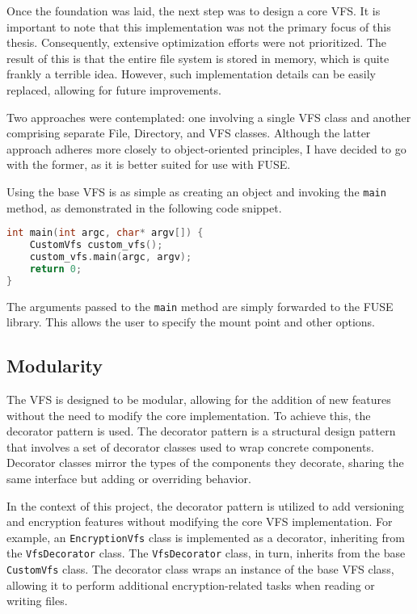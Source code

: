 Once the foundation was laid, the next step was to design a core VFS\@.
It is important to note that this implementation was not the primary focus of this thesis.
Consequently, extensive optimization efforts were not prioritized.
The result of this is that the entire file system is stored in memory, which is quite frankly a terrible idea.
However, such implementation details can be easily replaced, allowing for future improvements.


Two approaches were contemplated: one involving a single VFS class and another comprising separate File, Directory, and VFS classes.
Although the latter approach adheres more closely to object-oriented principles, I have decided to go with the former, as it is better suited for use with FUSE\@.

Using the base VFS is as simple as creating an object and invoking the \texttt{main} method, as demonstrated in the following code snippet.

\begin{lstlisting}[language=c++, basicstyle=\ttfamily\small]
int main(int argc, char* argv[]) {
    CustomVfs custom_vfs();
    custom_vfs.main(argc, argv);
    return 0;
}
\end{lstlisting}

The arguments passed to the \texttt{main} method are simply forwarded to the FUSE library.
This allows the user to specify the mount point and other options.

\subsection{Modularity}\label{subsec:modularity}

The VFS is designed to be modular, allowing for the addition of new features without the need to modify the core implementation.
To achieve this, the decorator pattern is used.
The decorator pattern is a structural design pattern that involves a set of decorator classes used to wrap concrete components.
Decorator classes mirror the types of the components they decorate, sharing the same interface but adding or overriding behavior.

In the context of this project, the decorator pattern is utilized to add versioning and encryption features without modifying the core VFS implementation.
For example, an \texttt{EncryptionVfs} class is implemented as a decorator, inheriting from the \texttt{VfsDecorator} class.
The \texttt{VfsDecorator} class, in turn, inherits from the base \texttt{CustomVfs} class.
The decorator class wraps an instance of the base VFS class, allowing it to perform additional encryption-related tasks when reading or writing files.

